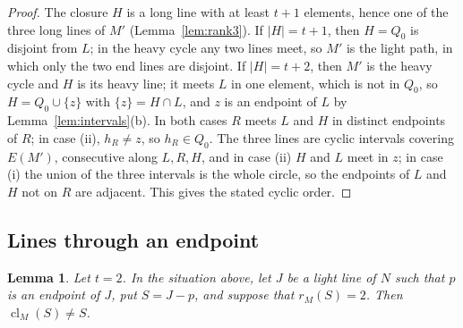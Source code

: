 \documentclass[11pt]{amsart}
\newtheorem{lemma}[theorem]{Lemma}
\theoremstyle{definition}
\theoremstyle{remark}
\numberwithin{equation}{section}
\newcommand{\cl}{\operatorname{cl}}
\begin{document}
\begin{proof}
The closure $H$ is a long line with at least $t+1$ elements, hence one of the three long lines of $M'$ (Lemma~\ref{lem:rank3}). If $|H|=t+1$, then $H=Q_0$ is disjoint from $L$; in the heavy cycle any two lines meet, so $M'$ is the light path, in which only the two end lines are disjoint. If $|H|=t+2$, then $M'$ is the heavy cycle and $H$ is its heavy line; it meets $L$ in one element, which is not in $Q_0$, so $H=Q_0\cup\{z\}$ with $\{z\}=H\cap L$, and $z$ is an endpoint of $L$ by Lemma~\ref{lem:intervals}(b). In both cases $R$ meets $L$ and $H$ in distinct endpoints of $R$; in case (ii), $h_R\ne z$, so $h_R\in Q_0$. The three lines are cyclic intervals covering $E(M')$, consecutive along $L,R,H$, and in case (ii) $H$ and $L$ meet in $z$; in case (i) the union of the three intervals is the whole circle, so the endpoints of $L$ and $H$ not on $R$ are adjacent. This gives the stated cyclic order.
\end{proof}

\subsection{Lines through an endpoint}

\begin{lemma}\label{lem:partV}
Let $t=2$. In the situation above, let $J$ be a light line of $N$ such that $p$ is an endpoint of $J$, put $S=J-p$, and suppose that $r_M(S)=2$. Then $\cl_M(S)\ne S$.
\end{lemma}
\end{document}
